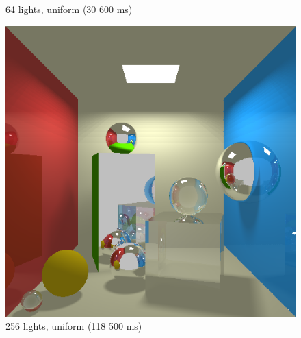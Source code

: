 \begin{figure}[H]
    \caption{64 lights, uniform (30 600 ms)}
\endminipage\hfill
{}
    \centering
    \includegraphics[width=\linewidth]{img/shadows/256.png}
    \caption{256 lights, uniform (118 500 ms)}
\endminipage\hfill
\end{figure}

